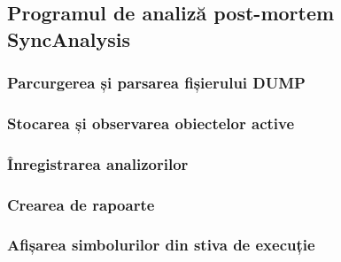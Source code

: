 \subsection{Programul de analiză post-mortem SyncAnalysis}
\label{executable}

\subsubsection{Parcurgerea și parsarea fișierului DUMP}

\subsubsection{Stocarea și observarea obiectelor active}

\subsubsection{Înregistrarea analizorilor}

\subsubsection{Crearea de rapoarte}

\subsubsection{Afișarea simbolurilor din stiva de execuție}
\label{stack-reconstruction}
